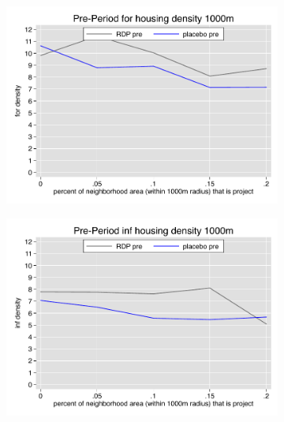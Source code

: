\documentclass[12pt]{article}
\begin{document}
\pagebreak





\begin{figure}
        \begin{subfigure}[b]{0.495\textwidth}
            \centering
            \includegraphics[width=\textwidth,trim={0.3cm .3cm 0.1cm 0cm}, clip=true]{figures/overlap_for_1000_total_pre.pdf}
        \end{subfigure}
        \hfill
        \begin{subfigure}[b]{0.495\textwidth}  
            \centering 
            \includegraphics[width=\textwidth,trim={0.3cm .3cm 0.1cm 0cm}, clip=true]{figures/overlap_inf_1000_total_pre.pdf}

\end{subfigure}
\end{figure}
\end{document}
